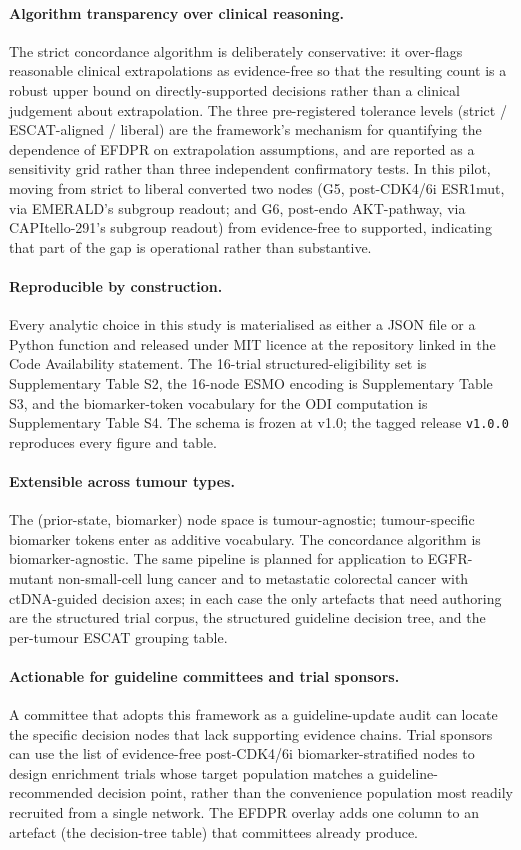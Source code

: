 \paragraph{Algorithm transparency over clinical reasoning.}
The strict concordance algorithm is deliberately conservative: it over-flags reasonable clinical extrapolations as evidence-free so that the resulting count is a robust upper bound on directly-supported decisions rather than a clinical judgement about extrapolation. The three pre-registered tolerance levels (strict / ESCAT-aligned / liberal) are the framework's mechanism for quantifying the dependence of EFDPR on extrapolation assumptions, and are reported as a sensitivity grid rather than three independent confirmatory tests. In this pilot, moving from strict to liberal converted two nodes (G5, post-CDK4/6i ESR1mut, via EMERALD's subgroup readout; and G6, post-endo AKT-pathway, via CAPItello-291's subgroup readout) from evidence-free to supported, indicating that part of the gap is operational rather than substantive.

\paragraph{Reproducible by construction.}
Every analytic choice in this study is materialised as either a JSON file or a Python function and released under MIT licence at the repository linked in the Code Availability statement. The 16-trial structured-eligibility set is Supplementary Table S2, the 16-node ESMO encoding is Supplementary Table S3, and the biomarker-token vocabulary for the ODI computation is Supplementary Table S4. The schema is frozen at v1.0; the tagged release \texttt{v1.0.0} reproduces every figure and table.

\paragraph{Extensible across tumour types.}
The (prior-state, biomarker) node space is tumour-agnostic; tumour-specific biomarker tokens enter as additive vocabulary. The concordance algorithm is biomarker-agnostic. The same pipeline is planned for application to EGFR-mutant non-small-cell lung cancer and to metastatic colorectal cancer with ctDNA-guided decision axes; in each case the only artefacts that need authoring are the structured trial corpus, the structured guideline decision tree, and the per-tumour ESCAT grouping table.

\paragraph{Actionable for guideline committees and trial sponsors.}
A committee that adopts this framework as a guideline-update audit can locate the specific decision nodes that lack supporting evidence chains. Trial sponsors can use the list of evidence-free post-CDK4/6i biomarker-stratified nodes to design enrichment trials whose target population matches a guideline-recommended decision point, rather than the convenience population most readily recruited from a single network. The EFDPR overlay adds one column to an artefact (the decision-tree table) that committees already produce.

